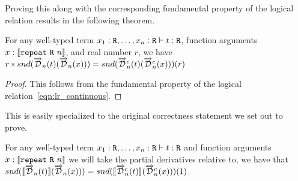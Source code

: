   Proving this along with the corresponding fundamental property of the logical relation results in the following theorem.
  \begin{theorem}
    For any well-typed term $x_1 : \texttt{R}, \dots, x_n : \texttt{R} \vdash t : \texttt{R}$, function arguments $x : \llbracket \texttt{repeat}\ \texttt{R}\ n \rrbracket$, and real number $r$, we have $r * snd(\overrightarrow{\mathcal{D}}_n(t)(\overrightarrow{\mathcal{D}}_n(x))) = snd(\overrightarrow{\mathcal{D}}^c_n(t)(\overrightarrow{\mathcal{D}}^c_n(x)))(r)$
  \end{theorem}
  \begin{proof}
    This follows from the fundamental property of the logical relation~\ref{eqn:lr_continuous}.
  \end{proof}
  This is easily specialized to the original correctness statement we set out to prove.
  \begin{corollary}
    For any well-typed term $x_1 : \synR, \dots, \linebreak x_n : \synR \vdash t : \synR$ and function arguments $x : \llbracket \texttt{repeat}\ \texttt{R}\ n \rrbracket$ we will take the partial derivatives relative to, we have that $snd(\llbracket\overrightarrow{\mathcal{D}}_n(t)\rrbracket (\overrightarrow{\mathcal{D}}_n(x))) = snd(\llbracket\overrightarrow{\mathcal{D}}^c_n(t)\rrbracket (\overrightarrow{\mathcal{D}}^c_n(x)))(1)$.
  \end{corollary}

